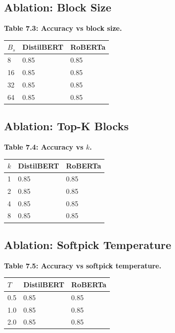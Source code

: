 \subsection{Ablation: Block Size}

\textbf{Table 7.3: Accuracy vs block size.}

\begin{table}[H]
\centering
\small
\begin{tabular}{lll}
\toprule
\textbf{$B_s$} & \textbf{DistilBERT} & \textbf{RoBERTa} \\
\midrule
8 & 0.85 & 0.85 \\
16 & 0.85 & 0.85 \\
32 & 0.85 & 0.85 \\
64 & 0.85 & 0.85 \\
\bottomrule
\end{tabular}
\end{table}

\subsection{Ablation: Top-K Blocks}

\textbf{Table 7.4: Accuracy vs $k$.}

\begin{table}[H]
\centering
\small
\begin{tabular}{lll}
\toprule
\textbf{$k$} & \textbf{DistilBERT} & \textbf{RoBERTa} \\
\midrule
1 & 0.85 & 0.85 \\
2 & 0.85 & 0.85 \\
4 & 0.85 & 0.85 \\
8 & 0.85 & 0.85 \\
\bottomrule
\end{tabular}
\end{table}

\subsection{Ablation: Softpick Temperature}

\textbf{Table 7.5: Accuracy vs softpick temperature.}

\begin{table}[H]
\centering
\small
\begin{tabular}{lll}
\toprule
\textbf{$T$} & \textbf{DistilBERT} & \textbf{RoBERTa} \\
\midrule
0.5 & 0.85 & 0.85 \\
1.0 & 0.85 & 0.85 \\
2.0 & 0.85 & 0.85 \\
\bottomrule
\end{tabular}
\end{table}

